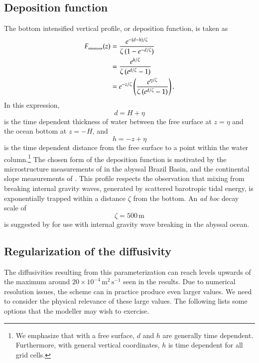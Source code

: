 \subsection{Deposition function}

The bottom intensified vertical profile, or deposition function, is
taken as
\begin{subequations}
\begin{align}
  F_{\mbox{\tiny simmons}}(z) &= \frac{e^{-(d-h)/\zeta}}{\zeta \, (1 - e^{-d/\zeta} )}
  \\
  &= \frac{e^{h/\zeta}}{\zeta \, (e^{d/\zeta}-1)}
 \\
  &= e^{-z/\zeta} \left( \frac{ e^{\eta/\zeta} }{ \zeta \, ( e^{d/\zeta} - 1 ) } \right).
\end{align}
\label{eq:simmons-vertical-function}
\end{subequations}
 In this expression,
\begin{equation}
  d = H + \eta
\end{equation}
is the time dependent thickness of water between the free surface at
$z=\eta$ and the ocean bottom at $z=-H$, and
\begin{equation}
  h=-z+\eta
\end{equation}
is the time dependent distance from the free surface to a point within
the water column.\footnote{We emphasize that with a free surface, $d$
and $h$ are generally time dependent.  Furthermore, with general
vertical coordinates, $h$ is time dependent for all grid cells.}  The
chosen form of the deposition function is motivated by the
microstructure measurements of \cite{StLaurent_etal2001} in the
abyssal Brazil Basin, and the continental slope measurements of
\cite{Moum_etal2002}.  This profile respects the observation that
mixing from breaking internal gravity waves, generated by scattered
barotropic tidal energy, is exponentially trapped within a distance
$\zeta$ from the bottom.  An {\em ad hoc} decay scale of
\begin{equation}
  \zeta = 500 \, \mbox{m}
\end{equation}
is suggested by \cite{Simmonsetal2004} for use with internal gravity
wave breaking in the abyssal ocean.


\subsection{Regularization of the diffusivity}

The diffusivities resulting from this parameterization can reach
levels upwards of the maximum around $20 \times 10^{-4} \,
\mbox{m}^{2} \, \mbox{s}^{-1}$ seen in the \cite{Polzinetal97}
results.  Due to numerical resolution issues, the scheme can in
practice produce even larger values.  We need to consider the physical
relevance of these large values.  The following lists some options
that the modeller may wish to exercise.

